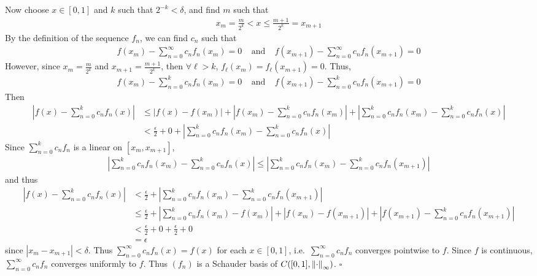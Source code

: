 \documentclass[12pt]{article}
\theoremstyle{plain}
\begin{document}
Now choose $x \in [0, 1]$ and $k$ such that $2^{-k} < \delta$, and find $m$ such that
\begin{align*}
    x_m = \frac{m}{2^k} < x \leq \frac{m+1}{2^k} = x_{m+1}
\end{align*}
By the definition of the sequence $f_n$, we can find $c_n$ such that
\begin{align*}
    f(x_m) - \sum_{n=0}^\infty c_nf_n(x_m) = 0\ \ \ \ \ \text{and}\ \ \ \ \ f(x_{m+1}) - \sum_{n=0}^\infty c_nf_n(x_{m+1}) = 0
\end{align*}
However, since $x_m = \frac{m}{2^k}$ and $x_{m+1} = \frac{m+1}{2^k}$, then $\forall \ell > k$, $f_\ell(x_m) = f_\ell(x_{m+1}) = 0$.  Thus,
\begin{align*}
    f(x_m) - \sum_{n=0}^k c_nf_n(x_m) = 0\ \ \ \ \ \text{and}\ \ \ \ \ f(x_{m+1}) - \sum_{n=0}^k c_nf_n(x_{m+1}) = 0
\end{align*}
Then
\begin{align*}
    \left|f(x) - \sum_{n=0}^k c_nf_n(x)\right| &\leq \left|f(x) - f(x_m)\right| + \left|f(x_m) - \sum_{n=0}^k c_nf_n(x_m)\right| + \left|\sum_{n=0}^k c_nf_n(x_m) - \sum_{n=0}^k c_nf_n(x)\right| \\
    &< \frac{\epsilon}{2} + 0 + \left|\sum_{n=0}^k c_nf_n(x_m) - \sum_{n=0}^k c_nf_n(x)\right|
\end{align*}
Since $\sum_{n=0}^kc_nf_n$ is a linear on $[x_m, x_{m+1}]$,
\begin{align*}
    \left|\sum_{n=0}^k c_nf_n(x_m) - \sum_{n=0}^k c_nf_n(x)\right| \leq \left|\sum_{n=0}^k c_nf_n(x_m) - \sum_{n=0}^k c_nf_n(x_{m+1})\right|
\end{align*}
and thus
\begin{align*}
    \left|f(x) - \sum_{n=0}^k c_nf_n(x)\right| &< \frac{\epsilon}{2} + \left|\sum_{n=0}^k c_nf_n(x_m) - \sum_{n=0}^k c_nf_n(x_{m+1})\right| \\
    &\leq \frac{\epsilon}{2} + \left|\sum_{n=0}^k c_nf_n(x_m) - f(x_m)\right| + \left|f(x_m) - f(x_{m+1})\right| + \left|f(x_{m+1}) - \sum_{n=0}^k c_nf_n(x_{m+1})\right| \\
    &< \frac{\epsilon}{2} + 0 + \frac{\epsilon}{2} + 0 \\
    &= \epsilon
\end{align*}
since $\left|x_m - x_{m+1}\right| < \delta$.  Thus $\sum_{n=0}^\infty c_nf_n(x) = f(x)$ for each $x \in [0,1]$, i.e.~$\sum_{n=0}^\infty c_nf_n$ converges pointwise to $f$.  Since $f$ is continuous, $\sum_{n=0}^\infty c_nf_n$ converges uniformly to $f$.  Thus $(f_n)$ is a Schauder basis of $C([0,1], \norm{\cdot}_\infty)$. \hfill $\square$
\end{document}
